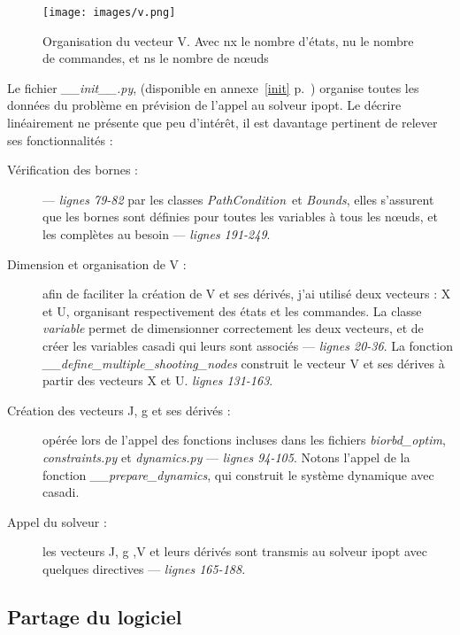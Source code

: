 \newpage

\begin{figure}[H]
\begin{center}
\texttt{[image: images/v.png]}
\caption{Organisation du vecteur V. Avec nx le nombre d'états, nu le nombre de commandes, et ns le nombre de nœuds}
\label{fig:v}
\end{center}
\end{figure}



Le fichier \emph{\_\_init\_\_.py}, (disponible en annexe~\ref{init} p.~\pageref{init}) organise toutes les données du problème en prévision de l'appel au solveur \gls{ipopt}. Le décrire linéairement ne présente que peu d'intérêt, il est davantage pertinent de relever ses fonctionnalités :
\begin{description}
\item[Vérification des bornes :] --- \emph{lignes 79-82} par les classes \emph{PathCondition} et \emph{Bounds}, elles s'assurent que les bornes sont définies pour toutes les variables à tous les nœuds, et les complètes au besoin --- \emph{lignes 191-249}.

\item[Dimension et organisation de V :] afin de faciliter la création de V et ses dérivés, j'ai utilisé deux vecteurs : X et U, organisant respectivement des états et les commandes.
La classe \emph{variable} permet de dimensionner correctement les deux vecteurs, et de créer les variables \gls{casadi} qui leurs sont associés --- \emph{lignes 20-36}. La fonction \emph{\_\_define\_multiple\_shooting\_nodes} construit le vecteur V et ses dérives à partir des vecteurs X et U.  \emph{lignes 131-163}. 


\item[Création des vecteurs J, g et ses dérivés :] opérée lors de l'appel des fonctions incluses dans les fichiers \emph{biorbd\_optim}, \emph{constraints.py} et \emph{dynamics.py} --- \emph{lignes 94-105}. Notons l'appel de la fonction \emph{\_\_prepare\_dynamics}, qui construit le système dynamique avec \gls{casadi}.

\item[Appel du solveur :] les vecteurs J, g ,V et leurs dérivés sont transmis au solveur \gls{ipopt} avec quelques directives --- \emph{lignes 165-188}.
\end{description}

            \subsection{Partage du logiciel}
            

